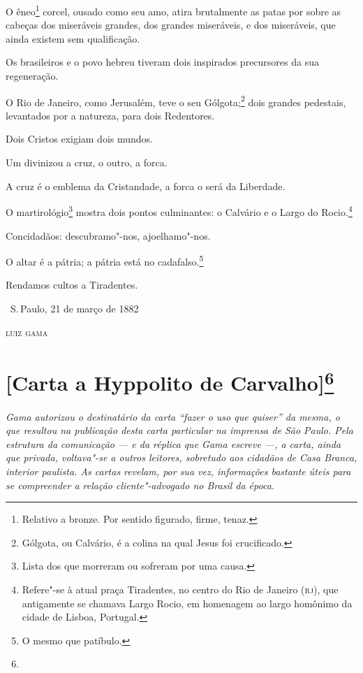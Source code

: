 O êneo\footnote{Relativo a bronze. Por sentido figurado, firme, tenaz.}
corcel, ousado como seu amo, atira brutalmente as patas por sobre as
cabeças dos miseráveis grandes, dos grandes miseráveis, e dos
miseráveis, que ainda existem sem qualificação.

Os brasileiros e o povo hebreu tiveram dois inspirados precursores da
sua regeneração.

O Rio de Janeiro, como Jerusalém, teve o seu Gólgota;\footnote{Gólgota,
  ou Calvário, é a colina na qual Jesus foi crucificado.} dois grandes
pedestais, levantados por a natureza, para dois Redentores.

Dois Cristos exigiam dois mundos.

Um divinizou a cruz, o outro, a forca.

A cruz é o emblema da Cristandade, a forca o será da Liberdade.

O martirológio\footnote{Lista dos que morreram ou sofreram por uma
  causa.} mostra dois pontos culminantes: o Calvário e o Largo do
Rocio.\footnote{Refere"-se à atual praça Tiradentes, no centro do Rio
  de Janeiro (\textsc{rj}), que antigamente se chamava Largo Rocio, em
  homenagem ao largo homônimo da cidade de Lisboa, Portugal.}

Concidadãos: descubramo"-nos, ajoelhamo"-nos.

O altar é a pátria; a pátria está no cadafalso.\footnote{O mesmo que
  patíbulo.}

Rendamos cultos a Tiradentes.

\bigskip

\hfill\ S.\,Paulo, 21 de março de 1882\smallskip

\hfill\textsc{luiz gama}


\chapter{{[}Carta a Hyppolito de Carvalho{]}\footnote[*]{}}

\begin{flushleft}
{\footnotesize\itshape
Gama autorizou o destinatário da carta ``fazer o uso que quiser'' da
mesma, o que resultou na publicação desta carta particular na imprensa
de São Paulo. Pela estrutura da comunicação --- e da réplica que Gama
escreve ---, a carta, ainda que privada, voltava"-se a outros leitores,
sobretudo aos cidadãos de Casa Branca, interior paulista. As cartas
revelam, por sua vez, informações bastante úteis para se compreender a
relação cliente"-advogado no Brasil da época.}
\end{flushleft}

